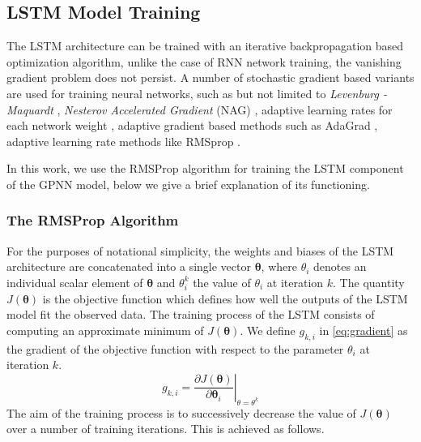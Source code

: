 \subsection{LSTM Model Training}

The LSTM architecture can be trained with an iterative backpropagation based optimization algorithm, 
unlike the case of RNN network training, the vanishing gradient problem does not persist. A number of stochastic 
gradient based variants are used for training neural networks, such as but not limited to 
\emph{Levenburg - Maquardt} \citep{marquardt1963algorithm}, \emph{Nesterov Accelerated Gradient} (NAG) 
\citep{nesterov1983method}, adaptive learning rates for each network weight \citep{SilvaAlmeida}, adaptive gradient 
based methods such as AdaGrad \citep{duchi2011adaptive}, adaptive learning rate methods like RMSprop 
\citep{tieleman2012lecture}. 

In this work, we use the RMSProp algorithm for training the LSTM component of the GPNN model, 
below we give a brief explanation of its functioning.

\subsubsection*{The RMSProp Algorithm}

For the purposes of notational simplicity, the weights and biases of the LSTM architecture are 
concatenated into a single vector $\mathbf{\theta}$, where $\theta_i$ denotes an individual 
scalar element of $\mathbf{\theta}$ and $\theta^{k}_{i}$ the value of $\theta_i$ at iteration $k$. 
The quantity $J(\mathbf{\theta})$ is the objective function which defines how well the outputs of 
the LSTM model fit the observed data. The training process of the LSTM consists of computing an 
approximate minimum of $J(\mathbf{\theta})$. We define $g_{k,i}$ in \cref{eq:gradient} as the gradient 
of the objective function with respect to the parameter $\theta_{i}$ at iteration $k$. 
%
\begin{equation}\label{eq:gradient}
 g_{k,i} = \left. \frac{\partial{J}(\mathbf{\theta})}{{\partial \mathbf{\theta}_i}}\right\rvert_{\theta = \theta^k}
\end{equation}
%
The aim of the training process is to successively decrease the value of $J(\mathbf{\theta})$ over a number of 
training iterations. This is achieved as follows.

